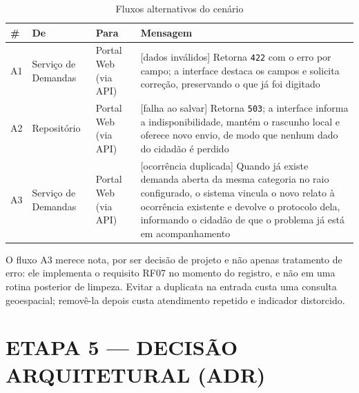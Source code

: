 \documentclass[12pt,a4paper,oneside]{article}
\newcommand{\fonte}[1]{\par\vspace{5pt}{\footnotesize\singlespacing Fonte: #1\par}}
\newcommand{\cab}[1]{\textbf{\footnotesize #1}}
\begin{document}
\begin{table}[H]
\centering
\caption{Fluxos alternativos do cenário}
\label{tab:alternativos}
{\small\singlespacing
\begin{tabularx}{\textwidth}{C{1.0cm} L{3.0cm} L{3.0cm} X}
\toprule
\cab{\#} & \cab{De} & \cab{Para} & \cab{Mensagem} \\
\midrule
A1 & Serviço de Demandas & Portal Web (via API) & [dados inválidos] Retorna
\texttt{422} com o erro por campo; a interface destaca os campos e solicita
correção, preservando o que já foi digitado \\
\addlinespace
A2 & Repositório & Portal Web (via API) & [falha ao salvar] Retorna
\texttt{503}; a interface informa a indisponibilidade, mantém o rascunho local e
oferece novo envio, de modo que nenhum dado do cidadão é perdido \\
\addlinespace
A3 & Serviço de Demandas & Portal Web (via API) & [ocorrência duplicada] Quando
já existe demanda aberta da mesma categoria no raio configurado, o sistema
vincula o novo relato à ocorrência existente e devolve o protocolo dela,
informando o cidadão de que o problema já está em acompanhamento \\
\bottomrule
\end{tabularx}}
\fonte{elaborado pelos autores (2026).}
\end{table}

O fluxo A3 merece nota, por ser decisão de projeto e não apenas tratamento de
erro: ele implementa o requisito RF07 no momento do registro, e não em uma
rotina posterior de limpeza. Evitar a duplicata na entrada custa uma consulta
geoespacial; removê-la depois custa atendimento repetido e indicador distorcido.

\section{ETAPA 5 — DECISÃO ARQUITETURAL (ADR)}
\label{sec:etapa5}
\end{document}
